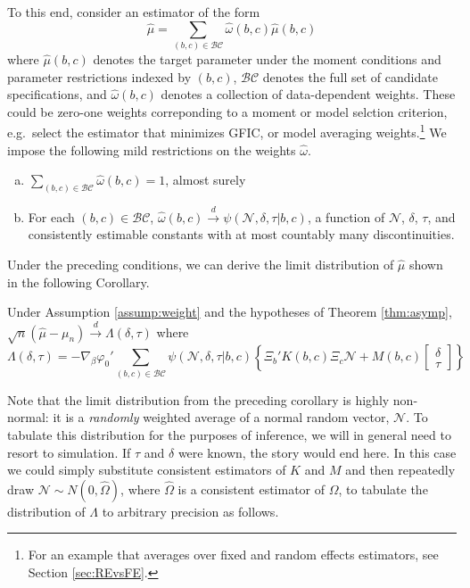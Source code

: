 To this end, consider an estimator of the form 
	$$\widehat{\mu} = \sum_{(b,c) \in \mathcal{BC}} \widehat{\omega}(b,c) \widehat{\mu}(b,c)$$
where $\widehat{\mu}(b,c)$ denotes the target parameter under the moment conditions and parameter restrictions indexed by $(b,c)$, $\mathcal{BC}$ denotes the full set of candidate specifications, and $\widehat{\omega}(b,c)$ denotes a collection of data-dependent weights.
These could be zero-one weights correponding to a moment or model selction criterion, e.g.\ select the estimator that minimizes GFIC, or model averaging weights.\footnote{For an example that averages over fixed and random effects estimators, see Section \ref{sec:REvsFE}.}
We impose the following mild restrictions on the weights $\widehat{\omega}$.

\begin{assump}\mbox{}
	\begin{enumerate}[(a)] 
		\item $\sum_{(b,c) \in \mathcal{BC}} \widehat{\omega}(b,c) = 1$, almost surely
    \item For each $(b,c) \in \mathcal{BC}$, $\widehat{\omega}(b,c) \overset{d}{\rightarrow} \psi(\mathscr{N}, \delta, \tau|b,c)$,  a function of $\mathscr{N}$, $\delta$, $\tau$, and consistently estimable constants with at most countably many discontinuities.
	\end{enumerate}
\label{assump:weight}
\end{assump}

Under the preceding conditions, we can derive the limit distribution of $\widehat{\mu}$ shown in the following Corollary.

\begin{cor}
  Under Assumption \ref{assump:weight} and the hypotheses of Theorem \ref{thm:asymp},  
	$\sqrt{n}\left(\widehat{\mu} - \mu_n\right) \overset{d}{\rightarrow} \Lambda(\delta,\tau)$
where
	\begin{equation}
		\Lambda(\delta,\tau) = -\nabla_\beta\varphi_0' \sum_{(b,c) \in \mathcal{BC}} \psi(\mathscr{N},\delta, \tau|b,c) \left\{\Xi_b' K(b,c) \Xi_c \mathscr{N} + M(b,c)  \left[\begin{array}{c}\delta \\ \tau \end{array} \right]\right\}
	\end{equation}
  \label{cor:avg}
\end{cor}
Note that the limit distribution from the preceding corollary is highly non-normal: it is a \emph{randomly} weighted average of a normal random vector, $\mathscr{N}$.
To tabulate this distribution for the purposes of inference, we will in general need to resort to simulation.
If $\tau$ and $\delta$ were known, the story would end here.
In this case we could simply substitute consistent estimators of $K$ and $M$ and then repeatedly draw $\mathscr{N} \sim N(0, \widehat{\Omega})$, where $\widehat{\Omega}$ is a consistent estimator of $\Omega$, to tabulate the distribution of $\Lambda$ to arbitrary precision as follows.

